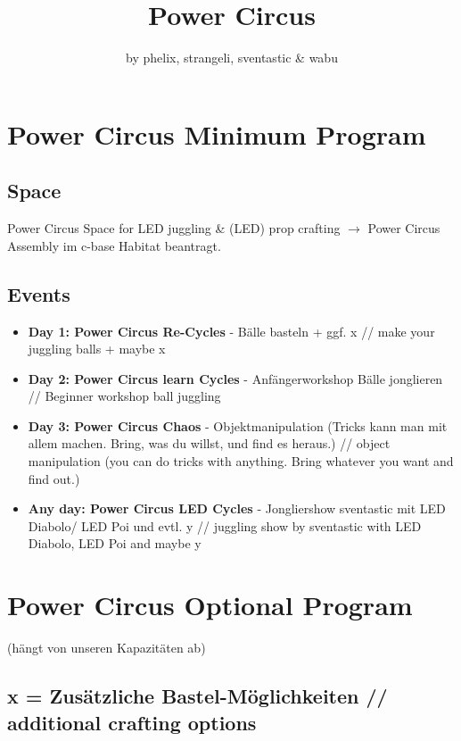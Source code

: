 \documentclass[a4]{article}
\title{Power Circus}
\author{by phelix, strangeli, sventastic \& wabu
}
\begin{document}
\maketitle


\section{Power Circus Minimum Program}

\subsection*{Space} Power Circus Space for LED juggling \& (LED) prop crafting $\rightarrow$ Power Circus Assembly im c-base Habitat beantragt.

\subsection*{Events}
\begin{itemize}
\item \textbf{Day 1: Power Circus Re-Cycles} - Bälle basteln + ggf. x // make your juggling balls + maybe x
\item\textbf{ Day 2: Power Circus learn Cycles} - Anfängerworkshop Bälle jonglieren // Beginner workshop ball juggling
\item \textbf{Day 3:  Power Circus Chaos} - Objektmanipulation (Tricks kann man mit allem machen. Bring, was du willst, und find es heraus.) // object manipulation (you can do tricks with anything. Bring whatever you want and find out.)
\item \textbf{Any day: Power Circus LED Cycles} - Jongliershow sventastic mit LED Diabolo/ LED Poi und evtl. y // juggling show by sventastic with LED Diabolo, LED Poi and maybe y
\end{itemize}

\section{Power Circus Optional Program} 
(hängt von unseren Kapazitäten ab)
\subsection*{x = Zusätzliche Bastel-Möglichkeiten // additional crafting options}  
 
\end{document}
